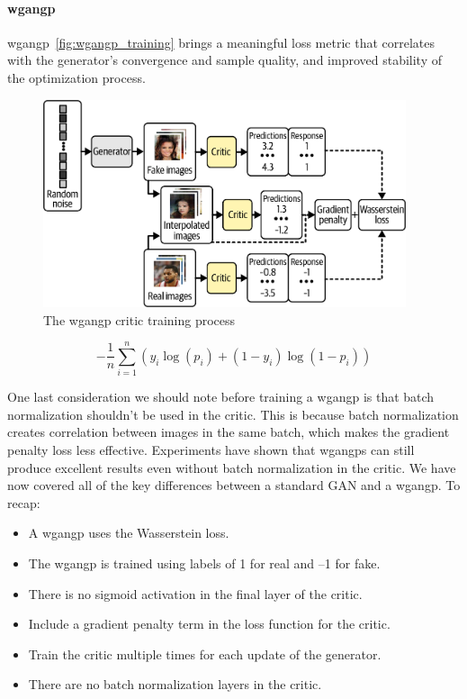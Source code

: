 \paragraph{\gls{wgangp}}

\gls{wgangp}~\autoref{fig:wgangp_training} brings a meaningful loss metric that correlates with the generator’s convergence and sample quality, and improved stability of the optimization process.

\begin{figure}
	\begin{center}
		\includegraphics[width=0.95\textwidth]{figures/wgangp_train}
	\end{center}
	\caption{The \gls{wgangp}  critic training process}\label{fig:wgangp_training}
\end{figure}

\begin{equation}
	-\frac{1}{n} \sum_{i=1}^{n} \left(y_i \log\left(p_i\right) + \left(1 - y_i\right)\log \left(1-p_i\right)\right)
	\label{eq:binary_cross_entropy_loss}
\end{equation}

One last consideration we should note before training a \gls{wgangp} is that batch normalization shouldn’t be used in the critic.
This is because batch normalization creates correlation between images in the same batch, which makes the gradient penalty loss less effective.
Experiments have shown that \glspl{wgangp}  can still produce excellent results even without batch normalization in the critic.
We have now covered all of the key differences between a standard GAN and a \gls{wgangp}. To recap:

\begin{itemize}
	\item A \gls{wgangp} uses the Wasserstein loss.
	\item The \gls{wgangp}  is trained using labels of 1 for real and –1 for fake.
	\item There is no sigmoid activation in the final layer of the critic.
	\item Include a gradient penalty term in the loss function for the critic.
	\item Train the critic multiple times for each update of the generator.
	\item There are no batch normalization layers in the critic.
\end{itemize}

